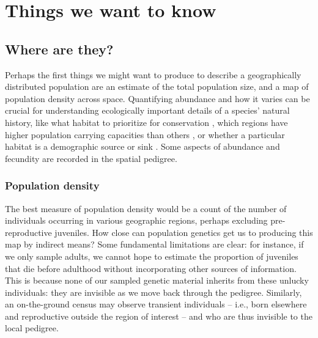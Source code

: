 \documentclass{ar-1col}
\begin{document}
\section{Things we want to know}

\subsection{Where are they?}

Perhaps the first things we might want to produce
to describe a geographically distributed population
are an estimate of the total population size,
and a map of population density across space.
Quantifying abundance and how it varies
can be crucial for understanding
ecologically important details of a species' natural history,
like what habitat to prioritize for conservation \citep{zipkin2018synthesizing}, 
which regions have higher population carrying capacities than others \citep{roughgarden1974}, 
or whether a particular habitat is a demographic source or sink 
\citep{pulliam1988sources}.
Some aspects of abundance and fecundity are recorded in the spatial pedigree.

\subsubsection{Population density}

The best measure of population density
would be a count of the number of individuals occurring in various geographic regions,
perhaps excluding pre-reproductive juveniles.
How close can population genetics get us to producing this map by indirect means?
Some fundamental limitations are clear:
for instance, if we only sample adults,
we cannot hope to estimate the proportion of juveniles that die before adulthood
without incorporating other sources of information.
This is because none of our sampled genetic material inherits from these unlucky individuals:
they are invisible as we move back through the pedigree.
Similarly, an on-the-ground census may observe transient individuals
-- i.e., born elsewhere and reproductive outside the region of interest --
and who are thus invisible to the local pedigree.
\end{document}
